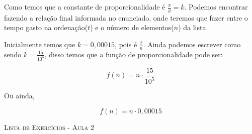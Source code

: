 \documentclass{scrartcl} %
\newcommand{\titulo}[1]{%
\begin{center}
    {\LARGE {\scshape #1}}
\end{center}
}
\newcounter{Exer}
\theoremstyle{geral}
\newcommand{\titulo}[1]{%
\begin{center}
    {\LARGE {\scshape #1}}
\end{center}
}
\begin{document}
\begin{multicols}{2}
\begin{question}
Como temos que a constante de proporcionalidade é \(\frac{x}{y} = k\). Podemos encontrar fazendo a relação final informada no enunciado, onde teremos que fazer entre o tempo gasto na ordenação(\(t\)) e o número de elementos(\(n\)) da lista.\par
Inicialmente temos que \(k = 0,00015\), pois  é \(\frac{t}{n}\). Ainda podemos escrever como sendo \(k = \frac{15}{10^5}\), disso temos que a função de proporcionalidade pode ser:

\[f(n) = n \cdot \frac{15}{10^5}\]

Ou ainda,

\[f(n) = n \cdot 0,00015\]

\end{question}
\end{multicols}

\newpage
\titulo{Lista de Exercícios - Aula 2}


\end{document}
